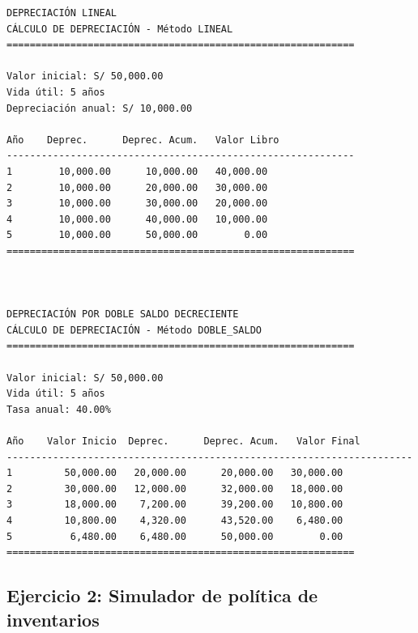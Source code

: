 \documentclass[
  doc,
  floatsintext,
  longtable,
  a4paper,
  nolmodern,
  notxfonts,
  notimes,
  12pt,
  colorlinks=true,linkcolor=blue,citecolor=blue,urlcolor=blue]{apa7}
\begin{document}
\begin{verbatim}
DEPRECIACIÓN LINEAL
CÁLCULO DE DEPRECIACIÓN - Método LINEAL
============================================================

Valor inicial: S/ 50,000.00
Vida útil: 5 años
Depreciación anual: S/ 10,000.00

Año    Deprec.      Deprec. Acum.   Valor Libro 
------------------------------------------------------------
1        10,000.00      10,000.00   40,000.00
2        10,000.00      20,000.00   30,000.00
3        10,000.00      30,000.00   20,000.00
4        10,000.00      40,000.00   10,000.00
5        10,000.00      50,000.00        0.00
============================================================



DEPRECIACIÓN POR DOBLE SALDO DECRECIENTE
CÁLCULO DE DEPRECIACIÓN - Método DOBLE_SALDO
============================================================

Valor inicial: S/ 50,000.00
Vida útil: 5 años
Tasa anual: 40.00%

Año    Valor Inicio  Deprec.      Deprec. Acum.   Valor Final 
----------------------------------------------------------------------
1         50,000.00   20,000.00      20,000.00   30,000.00
2         30,000.00   12,000.00      32,000.00   18,000.00
3         18,000.00    7,200.00      39,200.00   10,800.00
4         10,800.00    4,320.00      43,520.00    6,480.00
5          6,480.00    6,480.00      50,000.00        0.00
============================================================
\end{verbatim}

\subsection{Ejercicio 2: Simulador de política de
inventarios}\label{ejercicio-2-simulador-de-poluxedtica-de-inventarios}
\end{document}
